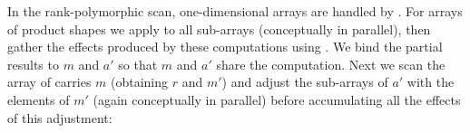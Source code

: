 In the rank-polymorphic scan, one-dimensional arrays are handled by .
For arrays of product shapes we apply  to all sub-arrays (conceptually
in parallel), then gather the effects produced by these computations using
.  We bind the partial results to $m$ and $a'$ so that $m$ and $a'$
share the computation.  Next we scan the array of carries $m$ (obtaining $r$
and $m'$) and adjust the sub-arrays of $a'$ with the elements of $m'$ (again
conceptually in parallel) before accumulating all the effects of this
adjustment:
\begin{code}%
%
\>[2]\AgdaSpace{}%
\AgdaSymbol{:}\AgdaSpace{}%
\AgdaSymbol{(}\AgdaSpace{}%
\AgdaSpace{}%
\AgdaSpace{}%
\AgdaSpace{}%
\AgdaSpace{}%
\AgdaSymbol{)}\AgdaSpace{}%
\AgdaSpace{}%
\AgdaSpace{}%
\AgdaSpace{}%
\AgdaSpace{}%
\AgdaSpace{}%
\AgdaSpace{}%
\AgdaSpace{}%
\AgdaSpace{}%
\AgdaSymbol{(}\AgdaSpace{}%
\AgdaSpace{}%
\AgdaSpace{}%
\AgdaSpace{}%
\AgdaSymbol{)}\<%
\\
%
\>[2]\AgdaSpace{}%
\AgdaSymbol{\{}\AgdaSpace{}%
\AgdaSymbol{=}\AgdaSpace{}%
\AgdaSpace{}%
\AgdaSymbol{\}}%
\>[21]\AgdaSpace{}%
\AgdaSpace{}%
\AgdaSpace{}%
\AgdaSymbol{=}\AgdaSpace{}%
\AgdaSpace{}%
\AgdaSpace{}%
\AgdaSpace{}%
\<%
\\
%
\>[2]\AgdaSpace{}%
\AgdaSymbol{\{}\AgdaSpace{}%
\AgdaSymbol{=}\AgdaSpace{}%
\AgdaSpace{}%
\AgdaSpace{}%
\AgdaSymbol{\}}%
\>[21]\AgdaSpace{}%
\AgdaSpace{}%
\AgdaSpace{}%
\AgdaSymbol{=}\AgdaSpace{}%
%
\>[190I]\AgdaSpace{}%
\AgdaOperator{\AgdaInductiveConstructor{,}}\AgdaSpace{}%
%
\>[40]\AgdaSpace{}%
\AgdaSpace{}%
\AgdaOperator{\AgdaFunction{<\$>}}\AgdaSpace{}%
\AgdaSymbol{(}\AgdaSpace{}%
\AgdaOperator{\AgdaFunction{\$}}\AgdaSpace{}%
\AgdaSpace{}%
\AgdaSymbol{(}\AgdaSpace{}%
\AgdaSpace{}%

\end{code}
